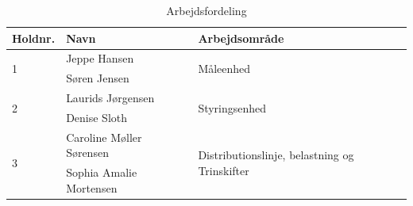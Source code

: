 \begin{table}[H]
	\centering
	\caption{Arbejdsfordeling}
	\label{tab:arbejdsfordeling}
	\begin{tabular}{@{}lll@{}}
		\toprule
		Holdnr.            & Navn                    & Arbejdsområde                                                  \\ \midrule
		\multirow{2}{*}{1} & Jeppe Hansen            & \multirow{2}{*}{Måleenhed}                                     \\
		& Søren Jensen            &                                                                \\\midrule
		\multirow{2}{*}{2} & Laurids Jørgensen       & \multirow{2}{*}{Styringsenhed}                                 \\
		& Denise Sloth            &                                                                \\\midrule
		\multirow{2}{*}{3} & Caroline Møller Sørensen         & \multirow{2}{*}{Distributionslinje, belastning og Trinskifter} \\
		& Sophia Amalie Mortensen &                                                                \\ \midrule
	\end{tabular}
\end{table}

